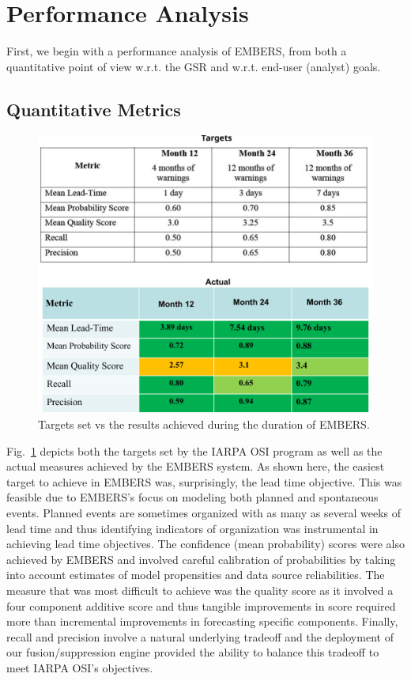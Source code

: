 \section{Performance Analysis}
First, we begin with a performance analysis of EMBERS, from both a quantitative point of view w.r.t.
the GSR and w.r.t. end-user (analyst) goals.
\subsection{Quantitative Metrics}
\begin{figure}
\includegraphics[width=0.8\columnwidth]{figures/cu/performance_tb1}
\caption{Targets set vs the results achieved during the duration of EMBERS.}
\label{quant}
\end{figure}
Fig.~\ref{quant} depicts both the targets set by the IARPA OSI program as well as the
actual measures achieved by the EMBERS system. As shown here, the easiest target to achieve
in EMBERS was, surprisingly, the lead time objective. This was feasible due to EMBERS's focus on modeling
both planned and spontaneous events. Planned events are sometimes organized with as many as several weeks
of lead time and thus identifying indicators of organization was instrumental in achieving
lead time objectives. The confidence (mean probability) scores were also achieved by EMBERS and involved
careful calibration of probabilities by taking into account estimates of
model propensities and data source reliabilities. The measure that was most difficult to achieve
was the quality score as it involved a four component additive score and thus tangible improvements in
score required more than incremental improvements in forecasting specific components. Finally, recall
and precision involve a natural underlying tradeoff and the deployment of our fusion/suppression
engine provided the ability to balance this tradeoff to meet IARPA OSI's objectives.

